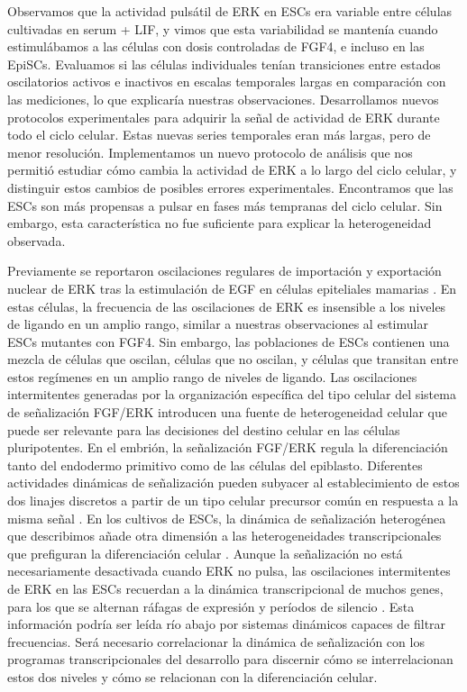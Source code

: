 \documentclass[./main.tex]{subfiles}
\begin{document}
Observamos que la actividad pulsátil de ERK en ESCs era variable entre células cultivadas en serum + LIF, y vimos que esta variabilidad se mantenía cuando estimulábamos a las células con dosis controladas de FGF4, e incluso en las EpiSCs. Evaluamos si las células individuales tenían transiciones entre estados oscilatorios activos e inactivos en escalas temporales largas en comparación con las mediciones, lo que explicaría nuestras observaciones. Desarrollamos nuevos protocolos experimentales para adquirir la señal de actividad de ERK durante todo el ciclo celular. Estas nuevas series temporales eran más largas, pero de menor resolución. Implementamos un nuevo protocolo de análisis que nos permitió estudiar cómo cambia la actividad de ERK a lo largo del ciclo celular, y distinguir estos cambios de posibles errores experimentales. Encontramos que las ESCs son más propensas a pulsar en fases más tempranas del ciclo celular. Sin embargo, esta característica no fue suficiente para explicar la heterogeneidad observada. 


Previamente se reportaron oscilaciones regulares de importación y exportación nuclear de ERK tras la estimulación de EGF en células epiteliales mamarias \cite{Shankaran2009}. En estas células, la frecuencia de las oscilaciones de ERK es insensible a los niveles de ligando en un amplio rango, similar a nuestras observaciones al estimular ESCs mutantes con FGF4. Sin embargo, las poblaciones de ESCs contienen una mezcla de células que oscilan, células que no oscilan, y células que transitan entre estos regímenes en un amplio rango de niveles de ligando. Las oscilaciones intermitentes generadas por la organización específica del tipo celular del sistema de señalización FGF/ERK introducen una fuente de heterogeneidad celular que puede ser relevante para las decisiones del destino celular en las células pluripotentes. En el embrión, la señalización FGF/ERK regula la diferenciación tanto del endodermo primitivo como de las células del epiblasto. Diferentes actividades dinámicas de señalización pueden subyacer al establecimiento de estos dos linajes discretos a partir de un tipo celular precursor común en respuesta a la misma señal \cite{Pokrass2020}. En los cultivos de ESCs, la dinámica de señalización heterogénea que describimos añade otra dimensión a las heterogeneidades transcripcionales que prefiguran la diferenciación celular \cite{Canham2010,Chambers2007,Hayashi2008,Singh2007,Toyooka2008}. Aunque la señalización no está necesariamente desactivada cuando ERK no pulsa, las oscilaciones intermitentes de ERK en las ESCs recuerdan a la dinámica transcripcional de muchos genes, para los que se alternan ráfagas de expresión y períodos de silencio \cite{Tunnacliffe2020}. Esta información podría ser leída río abajo por sistemas dinámicos capaces de filtrar frecuencias. Será necesario correlacionar la dinámica de señalización con los programas transcripcionales del desarrollo para discernir cómo se interrelacionan estos dos niveles y cómo se relacionan con la diferenciación celular.
\end{document}
